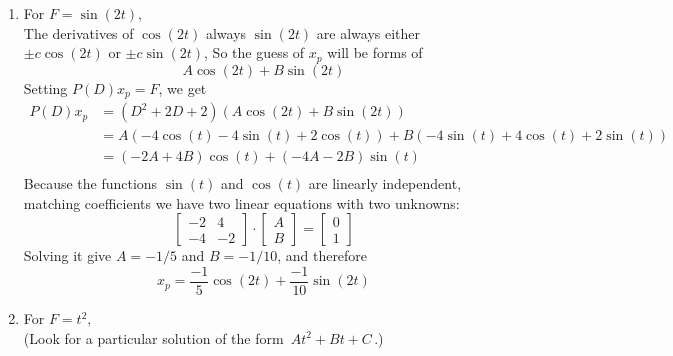 \begin{enumerate}
\item For $F=\sin (2t),$ \\
    The derivatives of $\cos (2t)$ always $\sin⁡(2t)$ are always
    either $\pm c \cos⁡ (2t)$ or $\pm c \sin⁡ (2t)$,
    So the guess of $x_p$ will be forms of 
    \begin{equation*}
      A \cos (2t) + B \sin (2t) 
    \end{equation*}
    Setting $P(D)x_ p= F$, we get
    \begin{align*}
      P(D)x_p
      &= (D^2+2D+2)\left( A \cos (2t) + B \sin (2t) \right) \\
      &= A \left(- 4 \cos (t) -4 \sin(t) + 2 \cos (t) \right)
        + B \left(- 4\sin (t) +4 \cos(t) + 2 \sin (t) \right) \\
      &= (-2A + 4B) \cos (t) + (-4A - 2B) \sin (t) \\    
    \end{align*}
    Because the functions $\sin⁡ (t)$ and $\cos⁡ (t)$ are linearly independent,
    matching coefficients we have two linear equations with two unknowns:
    \[
      \begin{bmatrix}
        -2 & 4 \\
        -4 & -2
      \end{bmatrix}
      \cdot
      \begin{bmatrix}
        A \\
        B
      \end{bmatrix}
      =
      \begin{bmatrix}
        0 \\
        1
      \end{bmatrix}
    \]   
    Solving it give $A = -1/5$ and $B = -1/10$, and therefore
    \begin{equation*}
      x _p = \frac{-1}{5} \cos (2t) + \frac{-1}{10} \sin(2t) 
    \end{equation*}

  \item For $F=t^2,$ \\
    (Look for a particular solution of the form $\, At^2+Bt+C\,$.)\\


\end{enumerate}
